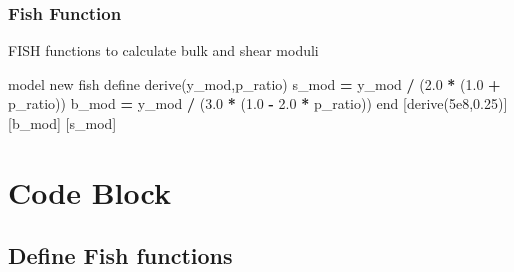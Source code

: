 \documentclass[a4paper, nobind]{templates/ociamthesis}
\newenvironment{Shaded}{\begin{snugshade}}{\end{snugshade}}
\newcommand{\FloatTok}[1]{\textcolor[rgb]{0.00,0.00,0.81}{#1}}
\newcommand{\NormalTok}[1]{#1}
\newcommand{\OperatorTok}[1]{\textcolor[rgb]{0.81,0.36,0.00}{\textbf{#1}}}
\renewenvironment{Shaded}
{
  \vspace{10pt}%
  \begin{snugshade}%
}{%
  \end{snugshade}%
  \vspace{8pt}%
}
\begin{document}
\hypertarget{fish-function}{%
\subsection{Fish Function}\label{fish-function}}

FISH functions to calculate bulk and shear moduli

\begin{Shaded}
\begin{Highlighting}[]
\NormalTok{model new}
\NormalTok{fish define derive(y\_mod,p\_ratio)}
\NormalTok{    s\_mod }\OperatorTok{=}\NormalTok{ y\_mod }\OperatorTok{/}\NormalTok{ (}\FloatTok{2.0} \OperatorTok{*}\NormalTok{ (}\FloatTok{1.0} \OperatorTok{+}\NormalTok{ p\_ratio))}
\NormalTok{    b\_mod }\OperatorTok{=}\NormalTok{ y\_mod }\OperatorTok{/}\NormalTok{ (}\FloatTok{3.0} \OperatorTok{*}\NormalTok{ (}\FloatTok{1.0} \OperatorTok{{-}} \FloatTok{2.0} \OperatorTok{*}\NormalTok{ p\_ratio))}
\NormalTok{end}
\NormalTok{[derive(}\FloatTok{5e8}\NormalTok{,}\FloatTok{0.25}\NormalTok{)]}
\NormalTok{[b\_mod] }
\NormalTok{[s\_mod]}
\end{Highlighting}
\end{Shaded}

\newpage

\hypertarget{code-block}{%
\chapter{Code Block}\label{code-block}}

\hypertarget{define-fish-functions}{%
\section{Define Fish functions}\label{define-fish-functions}}
\end{document}
